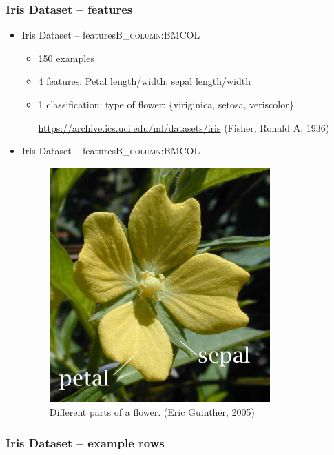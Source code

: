 \documentclass[10pt]{beamer}
\begin{document}
\subsubsection*{Iris Dataset -- features}
\label{sec:orgcb9ba85}
\begin{itemize}
\item Iris Dataset -- features\hfill{}\textsc{B\_column:BMCOL}
\label{sec:org032bbf4}
\begin{itemize}
\item 150 examples
\item 4 features: Petal length/width, sepal length/width
\item 1 classification: type of flower: \{viriginica, setosa, veriscolor\}

\url{https://archive.ics.uci.edu/ml/datasets/iris}
(Fisher, Ronald A, 1936)
\end{itemize}

\item Iris Dataset -- features\hfill{}\textsc{B\_column:BMCOL}
\label{sec:org92714f3}
\begin{figure}[htbp]
\centering
\includegraphics[width=0.8\textwidth]{images/Petal-sepal.jpg}
\caption{Different parts of a flower. (Eric Guinther, 2005)}
\end{figure}
\end{itemize}

\subsubsection*{Iris Dataset -- example rows}
\label{sec:org0fa17f9}
\end{document}
